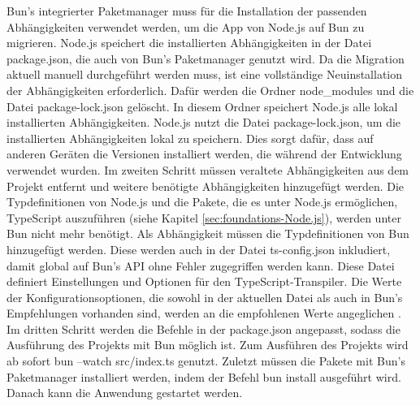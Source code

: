 \noindent
Bun's integrierter Paketmanager muss für die Installation der passenden Abhängigkeiten verwendet werden, um die App von Node.js auf Bun zu migrieren. Node.js speichert die installierten Abhängigkeiten in der Datei \glq package.json\grq{}, die auch von Bun's Paketmanager genutzt wird. Da die Migration aktuell manuell durchgeführt werden muss, ist eine vollständige Neuinstallation der Abhängigkeiten erforderlich. Dafür werden die Ordner \glq node\_modules\grq{} und die Datei \glq package-lock.json\grq{} gelöscht. In diesem Ordner speichert Node.js alle lokal installierten Abhängigkeiten. Node.js nutzt die Datei \glq package-lock.json\grq{}, um die installierten Abhängigkeiten lokal zu speichern. Dies sorgt dafür, dass auf anderen Geräten die Versionen installiert werden, die während der Entwicklung verwendet wurden. \newline
Im zweiten Schritt müssen veraltete Abhängigkeiten aus dem Projekt entfernt und weitere benötigte Abhängigkeiten hinzugefügt werden. Die Typdefinitionen von Node.js und die Pakete, die es unter Node.js ermöglichen, TypeScript auszuführen (siehe Kapitel \ref{sec:foundations-Node.js}), werden unter Bun nicht mehr benötigt. Als Abhängigkeit müssen die Typdefinitionen von Bun hinzugefügt werden. Diese werden auch in der Datei \glq ts-config.json\grq{} inkludiert, damit global auf Bun's API ohne Fehler zugegriffen werden kann. Diese Datei definiert Einstellungen und Optionen für den TypeScript-Transpiler. Die Werte der Konfigurationsoptionen, die sowohl in der aktuellen Datei als auch in Bun's Empfehlungen vorhanden sind, werden an die empfohlenen Werte angeglichen \cite{OvenSh.2023e}.\newline 
Im dritten Schritt werden die Befehle in der \glq package.json\grq{} angepasst, sodass die Ausführung des Projekts mit Bun möglich ist. Zum Ausführen des Projekts wird ab sofort \glq bun --watch src/index.ts\grq{} genutzt. Zuletzt müssen die Pakete mit Bun's Paketmanager installiert werden, indem der Befehl \glq bun install\grq{} ausgeführt wird. Danach kann die Anwendung gestartet werden.\\

